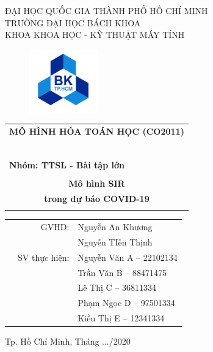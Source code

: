 \begin{titlepage}
\begin{center}
ĐẠI HỌC QUỐC GIA THÀNH PHỐ HỒ CHÍ MINH \\
TRƯỜNG ĐẠI HỌC BÁCH KHOA \\
KHOA KHOA HỌC - KỸ THUẬT MÁY TÍNH 
\end{center}

\vspace{1cm}

\begin{figure}[h!]
\begin{center}
\includegraphics[width=3cm]{Images/hcmut.png}
\end{center}
\end{figure}

\vspace{1cm}


\begin{center}
\begin{tabular}{c}
\multicolumn{1}{l}{\textbf{{\Large MÔ HÌNH HÓA TOÁN HỌC (CO2011)}}}\\
~~\\
\hline
\\
\multicolumn{1}{l}{\textbf{{\Large Nhóm: TTSL - Bài tập lớn}}}\\
\\
\textbf{{\Huge Mô hình SIR}} \\
\textbf{{\Huge trong dự báo COVID-19}}\\
\\
\hline
\end{tabular}
\end{center}

\vspace{1.5cm}

\begin{table}[h]
\begin{tabular}{rrl}
\hspace{5 cm} & GVHD: & Nguyễn An Khương\\
\hspace{5 cm} &  & Nguyễn TIến Thịnh\\

& SV thực hiện: & Nguyễn Văn A -- 22102134 \\
& & Trần Văn B -- 88471475 \\
& & Lê Thị C -- 36811334 \\
& & Phạm Ngọc D -- 97501334 \\
& & Kiều Thị E -- 12341334 \\
\end{tabular}
\end{table}
\vspace{1.5cm}
\begin{center}
{\footnotesize Tp. Hồ Chí Minh, Tháng .../2020}
\end{center}
\end{titlepage}
